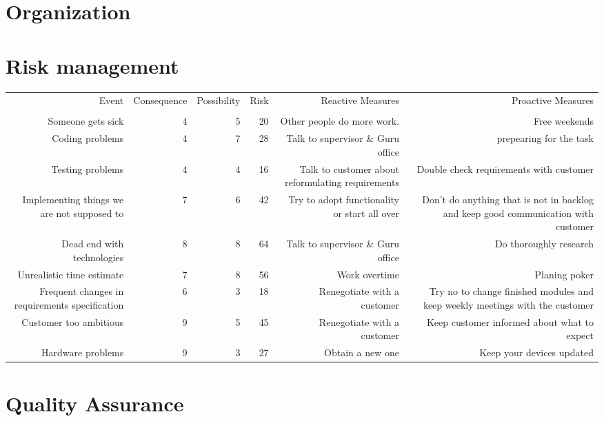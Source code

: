 \documentclass{article}
\begin{document}
\section{Organization}
\section{Risk management}

\begin{tabular}{rrrrrr}
Event & Consequence & Possibility & Risk  & Reactive Measures & Proactive Measures \\
      &       &       &       &       &  \\
Someone gets sick & 4     & 5     & 20    & Other people do more work.  & Free weekends \\
Coding problems & 4     & 7     & 28    & Talk to supervisor \& Guru office & prepearing for the task \\
Testing problems & 4     & 4     & 16    & Talk to customer about reformulating requirements & Double check requirements with customer \\
Implementing things we are not supposed to & 7     & 6     & 42    & Try to adopt functionality or start all over & Don't do anything that is not in backlog and keep good communication with customer \\
Dead end with technologies & 8     & 8     & 64    & Talk to supervisor \& Guru office & Do thoroughly research \\
Unrealistic time estimate & 7     & 8     & 56    & Work overtime  & Planing poker \\
Frequent changes in requirements specification & 6     & 3     & 18    & Renegotiate with a customer & Try no to change finished modules and keep weekly meetings with the customer \\
Customer too ambitious & 9     & 5     & 45    & Renegotiate with a customer & Keep customer informed about what  to expect \\
Hardware problems & 9     & 3     & 27    & Obtain a new one & Keep your devices updated \\
\end{tabular}%


\section{Quality Assurance}
\end{document}
